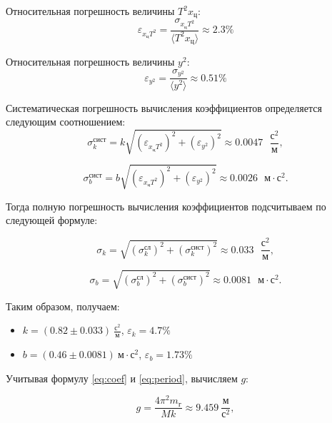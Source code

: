 \documentclass[a4paper, 12pt]{article}
\begin{document}
Относительная погрешность величины $T^2x_ц$:
\begin{equation}
    \varepsilon_{x_цT^2} = \frac{\sigma_{x_цT^2}}{\langle T^2x_ц \rangle} \approx 2.3 \%
\end{equation}

Относительная погрешность величины $y^2$:
\begin{equation}
    \varepsilon_{y^2} = \frac{\sigma_{y^2}}{\langle y^2 \rangle} \approx 0.51 \%
\end{equation}

Систематическая погрешность вычисления коэффициентов определяется следующим соотношением:
\begin{equation}
\sigma^\text{сист}_k = k\sqrt{\left( \varepsilon_{x_цT^2} \right)^2 + \left( \varepsilon_{y^2} \right)^2 } \approx 0.0047 \text{ }\frac{\text{с}^2}{\text{м}},
\end{equation}

\begin{equation}
\sigma^\text{сист}_b = b\sqrt{\left( \varepsilon_{x_цT^2} \right)^2 + \left( \varepsilon_{y^2} \right)^2 } \approx   0.0026 \text{ }\text{м}\cdot\text{с}^2.
\end{equation}

Тогда полную погрешность вычисления коэффициентов подсчитываем по следующей формуле:

\begin{equation}
\sigma_k = \sqrt{\left( \sigma_k^\text{сл} \right)^2 + \left( \sigma_k^\text{сист} \right)^2 } \approx 0.033 \text{ }\frac{\text{с}^2}{\text{м}},
\end{equation}

\begin{equation}
\sigma_b = \sqrt{\left( \sigma_b^\text{сл} \right)^2 + \left( \sigma_b^\text{сист} \right)^2 } \approx 0.0081 \text{ }\text{м}\cdot\text{с}^2.
\end{equation}

Таким образом, получаем:
\begin{itemize}
	\item $ k = (0.82 \pm 0.033) ~\frac{с^2}{м} $,   $ \varepsilon_k = 4.7 \% $
	\item $ b = (0.46 \pm 0.0081) ~ м \cdot с^2 $,    $\varepsilon_b = 1.73 \% $
\end{itemize}


Учитывая формулу \ref{eq:coef} и \ref{eq:period}, вычисляем $g$:

\begin{equation}
    g = \frac{4\pi^2m_г}{Mk} \approx 9.459 ~ \frac{м}{с^2},
\end{equation}
    
\end{document}
